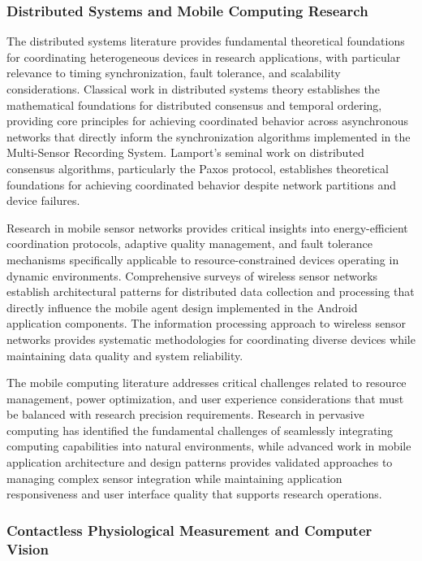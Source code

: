 \documentclass[12pt,a4paper]{article}
\begin{document}
\subsubsection{Distributed Systems and Mobile Computing Research}

The distributed systems literature provides fundamental theoretical foundations for coordinating heterogeneous devices
in research applications, with particular relevance to timing synchronization, fault tolerance, and scalability
considerations. Classical work in distributed systems theory establishes the mathematical foundations for distributed
consensus and temporal ordering, providing core principles for achieving coordinated behavior across asynchronous
networks that directly inform the synchronization algorithms implemented in the Multi-Sensor Recording System. Lamport's
seminal work on distributed consensus algorithms, particularly the Paxos protocol, establishes theoretical foundations
for achieving coordinated behavior despite network partitions and device failures.

Research in mobile sensor networks provides critical insights into energy-efficient coordination protocols, adaptive
quality management, and fault tolerance mechanisms specifically applicable to resource-constrained devices operating in
dynamic environments. Comprehensive surveys of wireless sensor networks establish architectural patterns for distributed
data collection and processing that directly influence the mobile agent design implemented in the Android application
components. The information processing approach to wireless sensor networks provides systematic methodologies for
coordinating diverse devices while maintaining data quality and system reliability.

The mobile computing literature addresses critical challenges related to resource management, power optimization, and
user experience considerations that must be balanced with research precision requirements. Research in pervasive
computing has identified the fundamental challenges of seamlessly integrating computing capabilities into natural
environments, while advanced work in mobile application architecture and design patterns provides validated approaches
to managing complex sensor integration while maintaining application responsiveness and user interface quality that
supports research operations.

\subsubsection{Contactless Physiological Measurement and Computer Vision}
\end{document}

